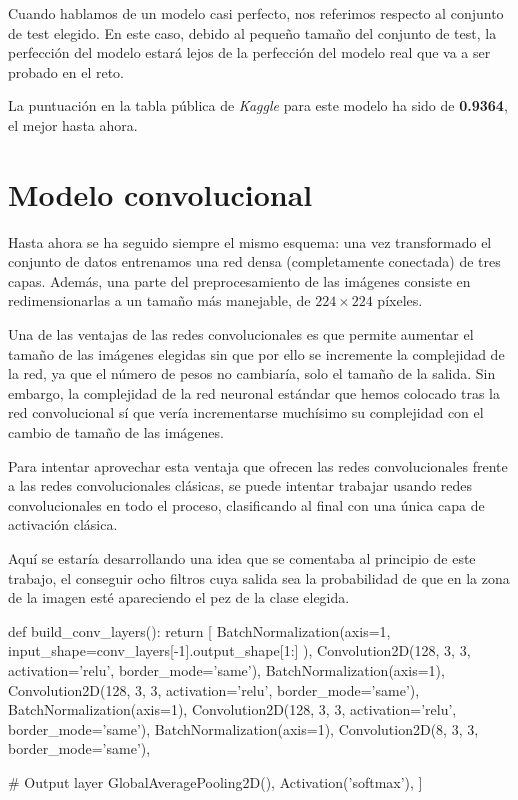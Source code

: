 Cuando hablamos de un modelo casi perfecto, nos referimos respecto al conjunto de test elegido. En este caso, debido al pequeño tamaño del conjunto de test, la perfección del modelo estará lejos de la perfección del modelo real que va a ser probado en el reto.

La puntuación en la tabla pública de \textit{Kaggle} para este modelo ha sido
de \textbf{0.9364}, el mejor hasta ahora.

\section{Modelo convolucional}

Hasta ahora se ha seguido siempre el mismo esquema: una vez transformado el conjunto de datos entrenamos una red densa (completamente conectada) de tres capas. Además, una parte del preprocesamiento de las imágenes consiste en redimensionarlas a un tamaño más manejable, de $224\times224$ píxeles.

Una de las ventajas de las redes convolucionales es que permite aumentar el tamaño de las imágenes elegidas sin que por ello se incremente la complejidad de la red, ya que el número de pesos no cambiaría, solo el tamaño de la salida. Sin embargo, la complejidad de la red neuronal estándar que hemos colocado tras la red convolucional sí que vería incrementarse muchísimo su complejidad con el cambio de tamaño de las imágenes.

Para intentar aprovechar esta ventaja que ofrecen las redes convolucionales frente a las redes convolucionales clásicas, se puede intentar trabajar usando redes convolucionales en todo el proceso, clasificando al final con una única capa de activación clásica.

Aquí se estaría desarrollando una idea que se comentaba al principio de este trabajo, el conseguir ocho filtros cuya salida sea la probabilidad de que en la zona de la imagen esté apareciendo el pez de la clase elegida.

\begin{python}
def build_conv_layers():
    return [
        BatchNormalization(axis=1,
            input_shape=conv_layers[-1].output_shape[1:]
        ),
        Convolution2D(128, 3, 3, activation='relu', border_mode='same'),
        BatchNormalization(axis=1),
        Convolution2D(128, 3, 3, activation='relu', border_mode='same'),
        BatchNormalization(axis=1),
        Convolution2D(128, 3, 3, activation='relu', border_mode='same'),
        BatchNormalization(axis=1),
        Convolution2D(8, 3, 3, border_mode='same'),

        # Output layer
        GlobalAveragePooling2D(),
        Activation('softmax'),
    ]
\end{python}

